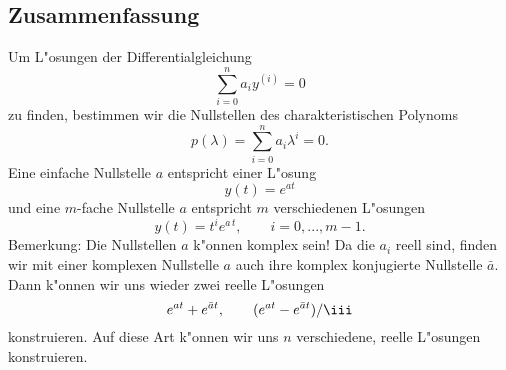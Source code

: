 \begin{auf}\cha\label{block3A2}

\end{auf}
\subsection{Zusammenfassung} 
Um L"osungen der Differentialgleichung
$$ \sum_{i=0}^n a_i y^{(i)} = 0$$
zu finden, bestimmen wir die Nullstellen des charakteristischen Polynoms
$$ p(\lambda) = \sum_{i=0}^n a_i \lambda^i = 0.$$
Eine einfache Nullstelle $a$ entspricht einer L"osung
$$ y(t) = e^{at}$$
und eine $m$-fache Nullstelle $a$ entspricht $m$ verschiedenen L"osungen
$$ y(t) = t^i e^{a\, t},\qquad i=0,...,m-1.$$
Bemerkung: Die Nullstellen $a$ k"onnen komplex sein! Da die $a_i$ reell sind, 
finden wir mit einer komplexen Nullstelle $a$ auch ihre komplex konjugierte 
Nullstelle $\bar a$. Dann k"onnen wir uns wieder zwei reelle L"osungen
$$ e^{a t}+e^{\bar a t},\qquad (e^{a t}-e^{\bar a t})/\iii$$
konstruieren. Auf diese Art k"onnen wir uns $n$ verschiedene, reelle L"osungen konstruieren.

